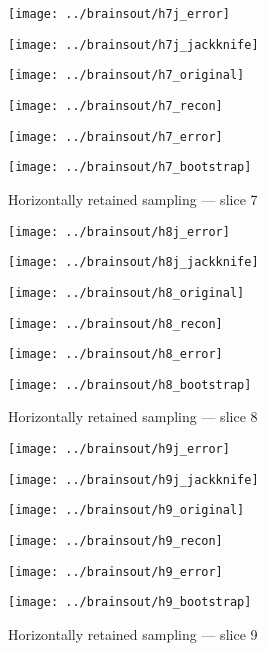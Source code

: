 \documentclass[review,supplement,onefignum,onetabnum,juq]{siamonline181217}
\begin{document}
\begin{figure}
\begin{centering}

\parbox{\imsize}{\texttt{[image: ../brainsout/h7j\_error]}}
\parbox{\imsize}{\texttt{[image: ../brainsout/h7j\_jackknife]}}

\vspace{\vertsep}

\parbox{\imsize}{\texttt{[image: ../brainsout/h7\_original]}}
\parbox{\imsize}{\texttt{[image: ../brainsout/h7\_recon]}}

\vspace{\vertsep}

\parbox{\imsize}{\texttt{[image: ../brainsout/h7\_error]}}
\parbox{\imsize}{\texttt{[image: ../brainsout/h7\_bootstrap]}}

\end{centering}
\caption{Horizontally retained sampling --- slice 7}
\end{figure}


\begin{figure}
\begin{centering}

\parbox{\imsize}{\texttt{[image: ../brainsout/h8j\_error]}}
\parbox{\imsize}{\texttt{[image: ../brainsout/h8j\_jackknife]}}

\vspace{\vertsep}

\parbox{\imsize}{\texttt{[image: ../brainsout/h8\_original]}}
\parbox{\imsize}{\texttt{[image: ../brainsout/h8\_recon]}}

\vspace{\vertsep}

\parbox{\imsize}{\texttt{[image: ../brainsout/h8\_error]}}
\parbox{\imsize}{\texttt{[image: ../brainsout/h8\_bootstrap]}}

\end{centering}
\caption{Horizontally retained sampling --- slice 8}
\end{figure}


\begin{figure}
\begin{centering}

\parbox{\imsize}{\texttt{[image: ../brainsout/h9j\_error]}}
\parbox{\imsize}{\texttt{[image: ../brainsout/h9j\_jackknife]}}

\vspace{\vertsep}

\parbox{\imsize}{\texttt{[image: ../brainsout/h9\_original]}}
\parbox{\imsize}{\texttt{[image: ../brainsout/h9\_recon]}}

\vspace{\vertsep}

\parbox{\imsize}{\texttt{[image: ../brainsout/h9\_error]}}
\parbox{\imsize}{\texttt{[image: ../brainsout/h9\_bootstrap]}}

\end{centering}
\caption{Horizontally retained sampling --- slice 9}
\end{figure}
\end{document}

